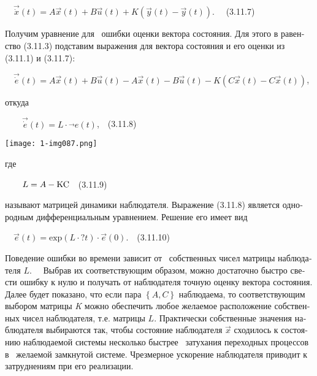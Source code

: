 \documentclass[a4paper]{article}
\newcommand\normalsubformula[1]{\text{\mathversion{normal}$#1$}}
\begin{document}
{\begin{russian}\sffamily
\ \  $\vec{\dot x}(t)=A\vec x(t)+B\vec u(t)+K\left(\vec y(t)-\vec y(t)\right)$. \ \ (3.11.7)
\end{russian}}

{\begin{russian}\sffamily
Получим уравнение для \ ошибки оценки вектора состояния. Для этого в равенство (3.11.3) подставим выражения для вектора
состояния и его оценки из (3.11.1) и (3.11.7):
\end{russian}}

{\begin{russian}\sffamily
\ \  $\vec{\dot e}(t)=A\vec x(t)+B\vec u(t)-A\vec x(t)-B\vec u(t)-K\left(C\vec x(t)-C\vec x(t)\right)$,
\end{russian}}

{\begin{russian}\sffamily
откуда
\end{russian}}

{\begin{russian}\sffamily
\ \ \ \  $\vec{\dot e}(t)=L\cdot \vec{}e(t)$,\ \ (3.11.8)
\end{russian}}


\bigskip

{\centering  \texttt{[image: 1-img087.png]} \par}
{\begin{russian}\sffamily
где
\end{russian}}

{\begin{russian}\sffamily
\ \ \ \  $L=A-\normalsubformula{\text{KC}}$\ \ (3.11.9)
\end{russian}}

{\begin{russian}\sffamily
называют матрицей динамики наблюдателя. Выражение (3.11.8) является однородным дифференциальным уравнением. Решение его
имеет вид
\end{russian}}

{\begin{russian}\sffamily
\ \  $\vec e(t)=\text{exp}\left(L\cdot ?t\right)\cdot \vec e\left(0\right)$.\ \ (3.11.10)
\end{russian}}

{\begin{russian}\sffamily
Поведение ошибки во времени зависит от \ собственных чисел матрицы наблюдателя  $L$. \ \ Выбрав их соответствующим
образом, можно достаточно быстро свести ошибку к нулю и получать от наблюдателя точную оценку вектора состояния. Далее
будет показано, что если пара  $\left\{A,C\right\}$ наблюдаема, то соот­вет­ствующим выбором матрицы \textit{K }можно
обеспечить любое желаемое рас­положение собственных чисел наблюдателя, т.е. матрицы  $L$. Практически собственные
значения наблюдателя выбираются так, чтобы состояние наблюдателя  $\vec x$ сходилось к состоянию наблюдаемой системы
несколько быстрее \ затухания пере­ходных процессов в \ желаемой замк­нутой системе. Чрезмерное ускорение наблюдателя
приводит к затру­днениям при его реализации.
\end{russian}}
\end{document}
